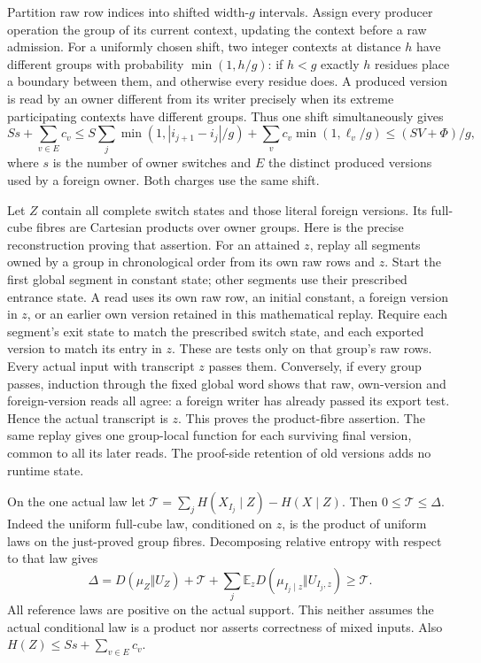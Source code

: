 \begin{outline}
Partition raw row indices into shifted width-$g$ intervals. Assign every
producer operation the group of its current context, updating the context
before a raw admission. For a uniformly chosen shift, two integer contexts
at distance $h$ have different groups with probability $\min(1,h/g)$:
if $h<g$ exactly $h$ residues place a boundary between them, and otherwise
every residue does. A produced version is read by an owner different from
its writer precisely when its extreme participating contexts have different
groups. Thus one shift simultaneously gives
\[
 S s+\sum_{v\in E}c_v
 \le S\sum_j\min(1,|i_{j+1}-i_j|/g)
       +\sum_vc_v\min(1,\ell_v/g)
 \le(SV+\Phi)/g,
\]
where $s$ is the number of owner switches and $E$ the distinct produced
versions used by a foreign owner. Both charges use the same shift.

Let $Z$ contain all complete switch states and those literal foreign
versions. Its full-cube fibres are Cartesian products over owner groups.
Here is the precise reconstruction proving that assertion. For an attained
$z$, replay all segments owned by a group in chronological order from its
own raw rows and $z$. Start the first global segment in constant state;
other segments use their prescribed entrance state. A read uses its own
raw row, an initial constant, a foreign version in $z$, or an earlier
own version retained in this mathematical replay. Require each segment's
exit state to match the prescribed switch state, and each exported version
to match its entry in $z$. These are tests only on that group's raw rows.
Every actual input with transcript $z$ passes them. Conversely, if every
group passes, induction through the fixed global word shows that raw,
own-version and foreign-version reads all agree: a foreign writer has
already passed its export test. Hence the actual transcript is $z$.
This proves the product-fibre assertion. The same replay gives one
group-local function for each surviving final version, common to all its
later reads. The proof-side retention of old versions adds no runtime state.

On the one actual law let
$\mathcal T=\sum_j H(X_{I_j}\mid Z)-H(X\mid Z)$.
Then $0\le\mathcal T\le\Delta$. Indeed the uniform full-cube law,
conditioned on $z$, is the product of uniform laws on the just-proved
group fibres. Decomposing relative entropy with respect to that law gives
\[
 \Delta=D(\mu_Z\Vert U_Z)+\mathcal T+
  \sum_j\mathbb E_z D(\mu_{I_j\mid z}\Vert U_{I_j,z})\ge\mathcal T.
\]
All reference laws are positive on the actual support. This neither assumes
the actual conditional law is a product nor asserts correctness of mixed
inputs. Also $H(Z)\le Ss+\sum_{v\in E}c_v$.


\end{outline}
